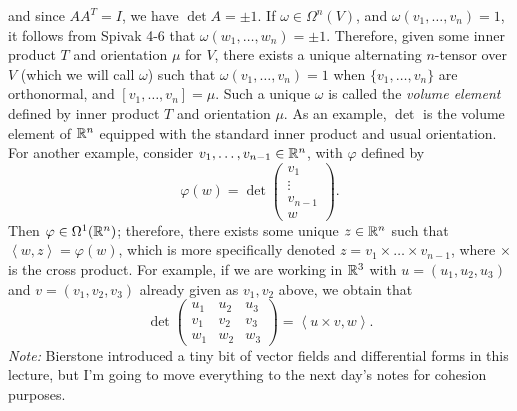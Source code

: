 and since $AA^T = I$, we have $\det A = \pm 1$. If $\omega \in \Omega^n(V)$, and $\omega(v_1, \dots, v_n) = 1$, it follows from Spivak 4-6 that $\omega(w_1, \dots, w_n) = \pm 1$. Therefore, given some inner product $T$ and orientation $\mu$ for $V$, there exists a unique alternating $n$-tensor over $V$ (which we will call $\omega$) such that $\omega(v_1, \dots, v_n) = 1$ when $\{v_1, \dots, v_n\}$ are orthonormal, and $[v_1, \dots, v_n] = \mu$. Such a unique $\omega$ is called the \textit{volume element} defined by inner product $T$ and orientation $\mu$.
\medskip\newline
As an example, $\det$ is the volume element of $\mathbb R^n$ equipped with the standard inner product and usual orientation.
\medskip\newline
For another example, consider $v_1, \dots, v_{n-1} \in \mathbb R^n$, with $\varphi$ defined by
\[ \varphi(w) = \det\begin{pmatrix} v_1 \\ \vdots \\ v_{n-1} \\ w \end{pmatrix}. \]
Then $\varphi \in \Omega^1(\mathbb R^n)$; therefore, there exists some unique $z \in \mathbb R^n$ such that $\left<w, z\right> = \varphi(w)$, which is more specifically denoted $z = v_1 \times \dots \times v_{n-1}$, where $\times$ is the cross product. For example, if we are working in $\mathbb R^3$ with $u = (u_1, u_2, u_3)$ and $v = (v_1, v_2, v_3)$ already given as $v_1, v_2$ above, we obtain that
\[ \det \begin{pmatrix} u_1 & u_2 & u_3 \\ v_1 & v_2 & v_3 \\ w_1 & w_2 & w_3 \end{pmatrix} = \left< u \times v, w \right>. \]
\textit{Note:} Bierstone introduced a tiny bit of vector fields and differential forms in this lecture, but I'm going to move everything to the next day's notes for cohesion purposes.